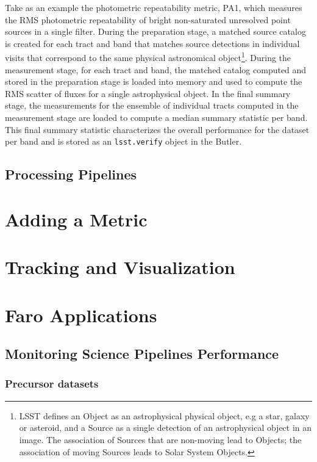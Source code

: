 Take as an example the photometric repeatability metric, PA1, which measures the RMS photometric repeatability of bright non-saturated unresolved point sources in a single filter.
During the preparation stage, a matched source catalog is created for each tract and band that matches source detections in individual visits that correspond to the same physical astronomical object\footnote{LSST defines an Object as an astrophysical physical object, e.g a star, galaxy or asteroid, and a Source as a  single detection of an astrophysical object in an image. The association of Sources that are non-moving lead to Objects; the association of moving Sources leads to Solar System Objects.}. 
During the measurement stage, for each tract and band, the matched catalog computed and stored in the preparation stage is loaded into memory and used to compute the RMS scatter of fluxes for a single astrophysical object. 
In the final summary stage, the measurements for the ensemble of individual tracts computed in the measurement stage are loaded to compute a median summary statistic per band. 
This final summary statistic characterizes the overall performance for the dataset per band and is stored as an \texttt{lsst.verify} object in the Butler. 


\subsection{Processing Pipelines} \label{ssec:pipelines}


\section{Adding a  Metric} \label{sec:add}


\section{Tracking and Visualization} \label{sec:tracking}


\section{Faro Applications} \label{sec:applications}

\subsection{Monitoring Science Pipelines Performance} \label{ssec:monitoring}

\subsubsection{Precursor datasets} \label{sssec:datasets}

